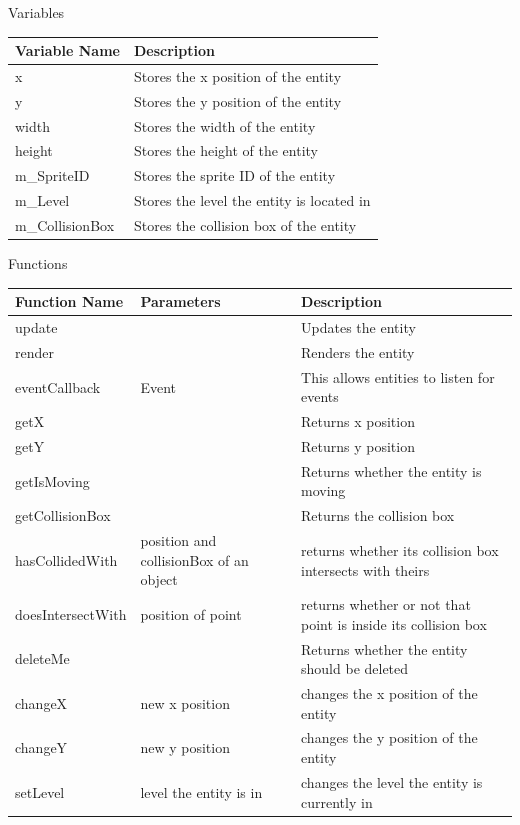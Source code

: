 \documentclass[../../Main.tex]{subfiles}
\begin{document}
    \begin{center}
        Variables
        \begin{tabular}{ | m{} | m{} | }
            \hline
            \textbf{Variable Name} & \textbf{Description} \\
            \hline
            x & Stores the x position of the entity \\
            \hline
            y & Stores the y position of the entity \\
            \hline
            width & Stores the width of the entity \\
            \hline
            height & Stores the height of the entity \\
            \hline
            m\_SpriteID & Stores the sprite ID of the entity \\
            \hline
            m\_Level & Stores the level the entity is located in \\
            \hline
            m\_CollisionBox & Stores the collision box of the entity \\
            \hline
        \end{tabular}
        Functions
        \begin{tabular}{ | m{} | m{}| m{} | }
            \hline
            \textbf{Function Name} & \textbf{Parameters} & \textbf{Description} \\
            \hline
            update & & Updates the entity \\
            \hline
            render & & Renders the entity \\
            \hline
            eventCallback & Event & This allows entities to listen for events \\
            \hline
            getX & & Returns x position \\
            \hline
            getY & & Returns y position \\
            \hline
            getIsMoving & & Returns whether the entity is moving \\
            \hline
            getCollisionBox & & Returns the collision box \\
            \hline
            hasCollidedWith & position and collisionBox of an object & returns whether its collision box intersects with theirs \\
            \hline
            doesIntersectWith & position of point & returns whether or not that point is inside its collision box \\
            \hline
            deleteMe & & Returns whether the entity should be deleted \\
            \hline
            changeX & new x position & changes the x position of the entity \\
            \hline
            changeY & new y position & changes the y position of the entity \\
            \hline
            setLevel & level the entity is in & changes the level the entity is currently in \\
            \hline
        \end{tabular}
    \end{center}
\end{document}
